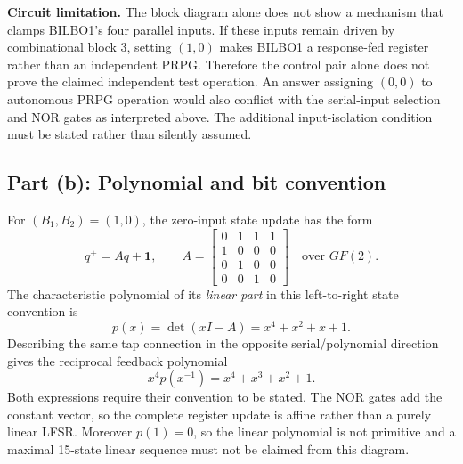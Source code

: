 \textbf{Circuit limitation.} The block diagram alone does not show a mechanism that clamps BILBO1's four parallel inputs. If these inputs remain driven by combinational block 3, setting $(1,0)$ makes BILBO1 a response-fed register rather than an independent PRPG. Therefore the control pair alone does not prove the claimed independent test operation. An answer assigning $(0,0)$ to autonomous PRPG operation would also conflict with the serial-input selection and NOR gates as interpreted above. The additional input-isolation condition must be stated rather than silently assumed.

\subsection{Part (b): Polynomial and bit convention}
For $(B_1,B_2)=(1,0)$, the zero-input state update has the form
\[
q^+=Aq+\boldsymbol{1},\qquad
A=\begin{bmatrix}
0&1&1&1\\1&0&0&0\\0&1&0&0\\0&0&1&0
\end{bmatrix}
\quad\text{over }GF(2).
\]
The characteristic polynomial of its \emph{linear part} in this left-to-right state convention is
\[
\boxed{p(x)=\det(xI-A)=x^4+x^2+x+1.}
\]
Describing the same tap connection in the opposite serial/polynomial direction gives the reciprocal feedback polynomial
\[
x^4p(x^{-1})=x^4+x^3+x^2+1.
\]
Both expressions require their convention to be stated. The NOR gates add the constant vector, so the complete register update is affine rather than a purely linear LFSR. Moreover $p(1)=0$, so the linear polynomial is not primitive and a maximal 15-state linear sequence must not be claimed from this diagram.
